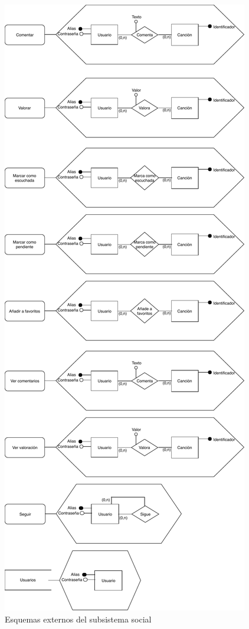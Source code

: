 \begin{figure}[H]
  \caption{Esquemas externos del subsistema social}
  \centering
  \includegraphics{diagramas/Esq-ext-social.pdf}
\end{figure}

